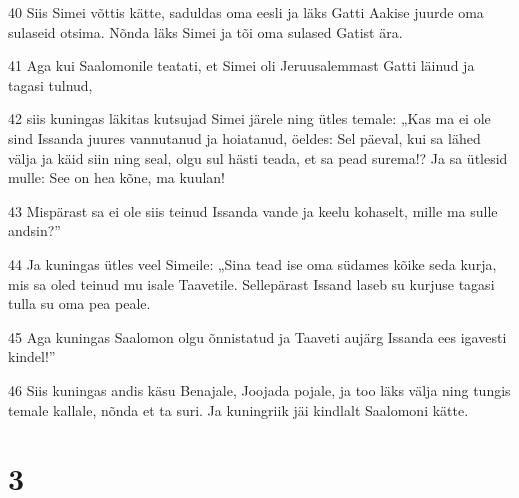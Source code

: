 \par 40 Siis Simei võttis kätte, saduldas oma eesli ja läks Gatti Aakise juurde oma sulaseid otsima. Nõnda läks Simei ja tõi oma sulased Gatist ära.
\par 41 Aga kui Saalomonile teatati, et Simei oli Jeruusalemmast Gatti läinud ja tagasi tulnud,
\par 42 siis kuningas läkitas kutsujad Simei järele ning ütles temale: „Kas ma ei ole sind Issanda juures vannutanud ja hoiatanud, öeldes: Sel päeval, kui sa lähed välja ja käid siin ning seal, olgu sul hästi teada, et sa pead surema!? Ja sa ütlesid mulle: See on hea kõne, ma kuulan!
\par 43 Mispärast sa ei ole siis teinud Issanda vande ja keelu kohaselt, mille ma sulle andsin?”
\par 44 Ja kuningas ütles veel Simeile: „Sina tead ise oma südames kõike seda kurja, mis sa oled teinud mu isale Taavetile. Sellepärast Issand laseb su kurjuse tagasi tulla su oma pea peale.
\par 45 Aga kuningas Saalomon olgu õnnistatud ja Taaveti aujärg Issanda ees igavesti kindel!”
\par 46 Siis kuningas andis käsu Benajale, Joojada pojale, ja too läks välja ning tungis temale kallale, nõnda et ta suri. Ja kuningriik jäi kindlalt Saalomoni kätte.

\chapter{3}

